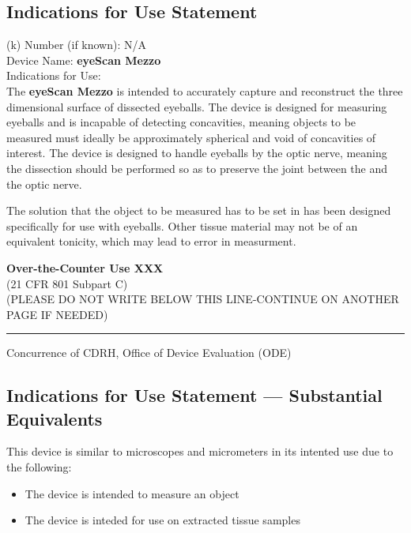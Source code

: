 \newpage
\subsection{Indications for Use Statement}

\onehalfspacing

(k) Number (if known): N/A \\
Device Name: \textbf{eyeScan Mezzo} \\
Indications for Use: \\

The \textbf{eyeScan Mezzo} is intended to accurately capture and
reconstruct the three dimensional surface of dissected eyeballs. The
device is designed for measuring eyeballs and is incapable of
detecting concavities, meaning objects to be measured must ideally be
approximately spherical and void of concavities of interest. The
device is designed to handle eyeballs by the optic nerve, meaning the
dissection should be performed so as to preserve the joint between the
and the optic nerve.

The solution that the object to be measured has to be set in has been
designed specifically for use with eyeballs. Other tissue material may
not be of an equivalent tonicity, which may lead to error in
measurment.

\vfill

\noindent \textbf{Over-the-Counter Use XXX} \\
(21 CFR 801 Subpart C)\\[1em]

\noindent (PLEASE DO NOT WRITE BELOW THIS LINE-CONTINUE ON ANOTHER PAGE IF
NEEDED)

\rule{\linewidth}{0.5mm}
\begin{center}
  Concurrence of CDRH, Office of Device Evaluation (ODE)
\end{center}

\vspace{5em}

\newpage
\subsection{Indications for Use Statement --- Substantial Equivalents}

This device is similar to microscopes and micrometers in its intented
use due to the following:

\begin{itemize}
\item The device is intended to measure an object
\item The device is inteded for use on extracted tissue samples
\end{itemize}

